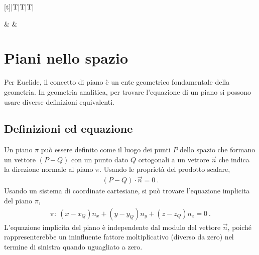 \documentclass[letterpaper,10pt,italian]{jupyterBook}
\begin{document}
\begin{savenotes}\sphinxattablestart
\centering
\begin{tabulary}{\linewidth}[t]{|T|T|T|}
\hline

\sphinxAtStartPar
{}
&
\sphinxAtStartPar
{}
&
\sphinxAtStartPar
{}
\\
\hline
\end{tabulary}
\par
\sphinxattableend\end{savenotes}

\sphinxstepscope


\section{Piani nello spazio}
\label{\detokenize{ch/analytic_geometry/analytic_geometry_3d/planes:piani-nello-spazio}}\label{\detokenize{ch/analytic_geometry/analytic_geometry_3d/planes:geometry-analytic-3d-planes}}\label{\detokenize{ch/analytic_geometry/analytic_geometry_3d/planes::doc}}
\sphinxAtStartPar
Per Euclide, il concetto di piano è un ente geometrico fondamentale della geometria. In geometria analitica, per trovare l’equazione di un piano si possono usare diverse definizioni equivalenti.


\subsection{Definizioni ed equazione}
\label{\detokenize{ch/analytic_geometry/analytic_geometry_3d/planes:definizioni-ed-equazione}}\label{\detokenize{ch/analytic_geometry/analytic_geometry_3d/planes:geometry-analytic-3d-planes-def}}
\sphinxAtStartPar
{}
Un piano \(\pi\) può essere definito come il luogo dei punti \(P\) dello spazio che formano un vettore \((P-Q)\) con un punto dato \(Q\) ortogonali a un vettore \(\overrightarrow{n}\) che indica la direzione normale al piano \(\pi\). Usando le proprietà del prodotto scalare,
\begin{equation*}
\begin{split}(P-Q) \cdot \overrightarrow{n} = 0 \ .\end{split}
\end{equation*}
\sphinxAtStartPar
Usando un sistema di coordinate cartesiane, si può trovare l’equazione implicita del piano \(\pi\),
\begin{equation}\label{equation:ch/analytic_geometry/analytic_geometry_3d/planes:eq:geometry:analytic:3d:planes:def-1}
\begin{split}\pi: \ (x - x_Q) n_x + (y - y_Q) n_y + (z - z_Q) n_z = 0 \ .\end{split}
\end{equation}
\sphinxAtStartPar
{} L’equazione implicita del piano è independente dal modulo del vettore \(\vec{n}\), poiché rappresenterebbe un ininfluente fattore moltiplicativo (diverso da zero) nel termine di sinistra quando uguagliato a zero.
\end{document}
